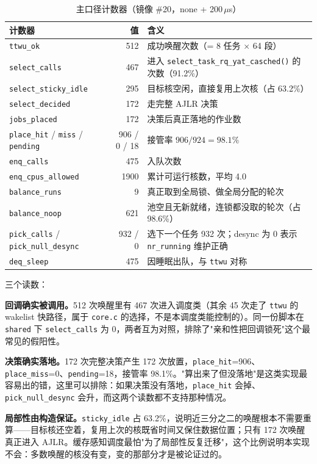 \begin{table}[H]
\centering
\caption{主口径计数器（镜像 \#20，none + 200\,$\mu$s）}
\label{tab:counters}
\small
\begin{tabular}{@{}p{4.4cm}rp{7.6cm}@{}}
\toprule
计数器 & 值 & 含义 \\
\midrule
\texttt{ttwu\_ok} & 512 & 成功唤醒次数（= 8 任务 $\times$ 64 段） \\
\texttt{select\_calls} & 467 & 进入 \texttt{select\_task\_rq\_yat\_casched()} 的次数（91.2\%） \\
\texttt{select\_sticky\_idle} & 295 & 目标核空闲，直接复用上次核（占 63.2\%） \\
\texttt{select\_decided} & 172 & 走完整 AJLR 决策 \\
\texttt{jobs\_placed} & 172 & 决策后真正落地的作业数 \\
\texttt{place\_hit} / \texttt{miss} / \texttt{pending} & 906 / 0 / 18 & 接管率 $906/924=98.1\%$ \\
\texttt{enq\_calls} & 475 & 入队次数 \\
\texttt{enq\_cpus\_allowed} & 1900 & 累计可运行核数，平均 4.0 \\
\texttt{balance\_runs} & 9 & 真正取到全局锁、做全局分配的轮次 \\
\texttt{balance\_noop} & 621 & 池空且无新就绪，连锁都没取的轮次（占 98.6\%） \\
\texttt{pick\_calls} / \texttt{pick\_null\_desync} & 932 / 0 & 选下一个任务 932 次；desync 为 0 表示 \texttt{nr\_running} 维护正确 \\
\texttt{deq\_sleep} & 475 & 因睡眠出队，与 \texttt{ttwu} 对称 \\
\bottomrule
\end{tabular}
\end{table}

三个读数：

\textbf{回调确实被调用。}512 次唤醒里有 467 次进入调度类（其余 45 次走了 \texttt{ttwu} 的 wakelist 快路径，属于 \texttt{core.c} 的选择，不是本调度类能控制的）。同一份脚本在 \texttt{shared} 下 \texttt{select\_calls} 为 0，两者互为对照，排除了"亲和性把回调锁死"这个最常见的假阳性。

\textbf{决策确实落地。}172 次完整决策产生 172 次放置，\texttt{place\_hit}=906、\texttt{place\_miss}=0、\texttt{pending}=18，接管率 98.1\%。"算出来了但没落地"是这类实现最容易出的错，这里可以排除：如果决策没有落地，\texttt{place\_hit} 会掉、\texttt{pick\_null\_desync} 会升，而这两个读数都不支持那种情况。

\textbf{局部性由构造保证。}\texttt{sticky\_idle} 占 63.2\%，说明近三分之二的唤醒根本不需要重算——目标核还空着，复用上次的核既省时间又保住数据位置；只有 172 次唤醒真正进入 AJLR。缓存感知调度最怕"为了局部性反复迁移"，这个比例说明本实现不会：多数唤醒的核没有变，变的那部分才是被论证过的。

